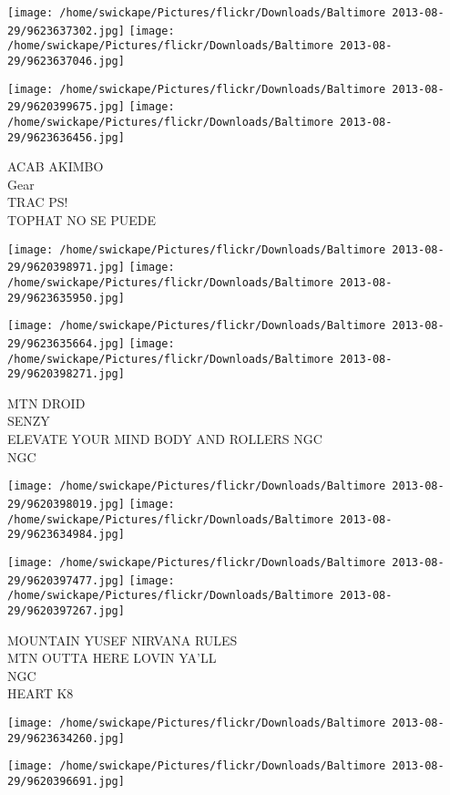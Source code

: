 \documentclass[10pt,letterpaper]{article}
\begin{document}
\texttt{[image: /home/swickape/Pictures/flickr/Downloads/Baltimore 2013-08-29/9623637302.jpg]}
\texttt{[image: /home/swickape/Pictures/flickr/Downloads/Baltimore 2013-08-29/9623637046.jpg]}

\texttt{[image: /home/swickape/Pictures/flickr/Downloads/Baltimore 2013-08-29/9620399675.jpg]}
\texttt{[image: /home/swickape/Pictures/flickr/Downloads/Baltimore 2013-08-29/9623636456.jpg]}

ACAB AKIMBO\\
Gear\\
TRAC PS!\\
TOPHAT NO SE PUEDE\\
\pagebreak

\texttt{[image: /home/swickape/Pictures/flickr/Downloads/Baltimore 2013-08-29/9620398971.jpg]}
\texttt{[image: /home/swickape/Pictures/flickr/Downloads/Baltimore 2013-08-29/9623635950.jpg]}

\texttt{[image: /home/swickape/Pictures/flickr/Downloads/Baltimore 2013-08-29/9623635664.jpg]}
\texttt{[image: /home/swickape/Pictures/flickr/Downloads/Baltimore 2013-08-29/9620398271.jpg]}

MTN DROID\\
SENZY\\
ELEVATE YOUR MIND BODY AND ROLLERS NGC\\
NGC\\
\pagebreak

\texttt{[image: /home/swickape/Pictures/flickr/Downloads/Baltimore 2013-08-29/9620398019.jpg]}
\texttt{[image: /home/swickape/Pictures/flickr/Downloads/Baltimore 2013-08-29/9623634984.jpg]}

\texttt{[image: /home/swickape/Pictures/flickr/Downloads/Baltimore 2013-08-29/9620397477.jpg]}
\texttt{[image: /home/swickape/Pictures/flickr/Downloads/Baltimore 2013-08-29/9620397267.jpg]}

MOUNTAIN YUSEF NIRVANA RULES\\
MTN OUTTA HERE LOVIN YA'LL\\
NGC\\
HEART K8\\
\pagebreak

\texttt{[image: /home/swickape/Pictures/flickr/Downloads/Baltimore 2013-08-29/9623634260.jpg]}

\vspace{0.25in}
\texttt{[image: /home/swickape/Pictures/flickr/Downloads/Baltimore 2013-08-29/9620396691.jpg]}
\end{document}
